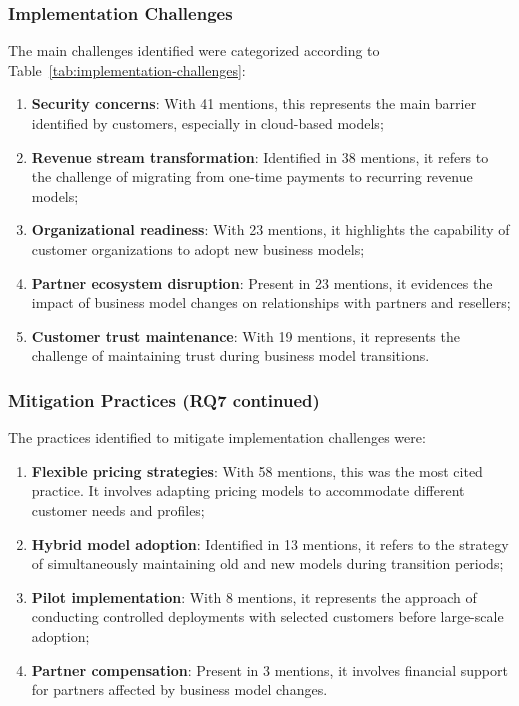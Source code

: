\documentclass[journal]{IEEEtran}
\begin{document}
\subsubsection{Implementation Challenges}

The main challenges identified were categorized according to Table~\ref{tab:implementation-challenges}:



\begin{enumerate}
    \item \textbf{Security concerns}: With 41 mentions, this represents the main barrier identified by customers, especially in cloud-based models;

    \item \textbf{Revenue stream transformation}: Identified in 38 mentions, it refers to the challenge of migrating from one-time payments to recurring revenue models;

    \item \textbf{Organizational readiness}: With 23 mentions, it highlights the capability of customer organizations to adopt new business models;

    \item \textbf{Partner ecosystem disruption}: Present in 23 mentions, it evidences the impact of business model changes on relationships with partners and resellers;

    \item \textbf{Customer trust maintenance}: With 19 mentions, it represents the challenge of maintaining trust during business model transitions.
\end{enumerate}

\subsubsection{Mitigation Practices (RQ7 continued)}

The practices identified to mitigate implementation challenges were:

\begin{enumerate}
    \item \textbf{Flexible pricing strategies}: With 58 mentions, this was the most cited practice. It involves adapting pricing models to accommodate different customer needs and profiles;

    \item \textbf{Hybrid model adoption}: Identified in 13 mentions, it refers to the strategy of simultaneously maintaining old and new models during transition periods;

    \item \textbf{Pilot implementation}: With 8 mentions, it represents the approach of conducting controlled deployments with selected customers before large-scale adoption;

    \item \textbf{Partner compensation}: Present in 3 mentions, it involves financial support for partners affected by business model changes.
\end{enumerate}
\end{document}
